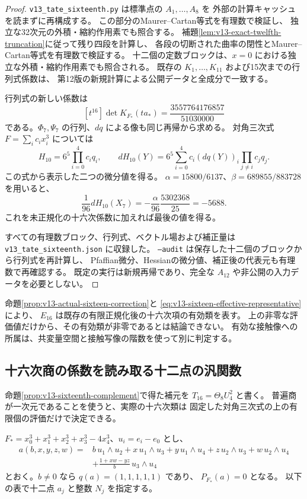 \begin{proof}
\texttt{v13\_tate\_sixteenth.py} は標準点の $A_1,\ldots,A_8$ を
外部の計算キャッシュを読まずに再構成する。
この部分のMaurer--Cartan等式を有理数で検証し、
独立な32次元の外積・縮約作用素でも照合する。
補題\ref{lem:v13-exact-twelfth-truncation}に従って残り四段を計算し、
各段の切断された曲率の閉性とMaurer--Cartan等式を有理数で検証する。
十二個の定数ブロックは、$x=0$ における独立な外積・縮約作用素でも照合される。
既存の $K_1,\ldots,K_{11}$ および15次までの行列式係数は、
第12版の新規計算による公開データと全成分で一致する。

行列式の新しい係数は
\[
 [t^{16}]\det K_{F_*}(ta_*)=\frac{3557764176857}{51030000}
\]
である。$\Phi_7,\Psi_7$ の行列、$dq$ による像も同じ再帰から求める。
対角三次式 $F=\sum_i c_ix_i^3$ については
\[
 H_{10}=6^5\prod_{i=0}^4c_iq_i,\qquad
 dH_{10}(Y)
 =6^5\sum_{i=0}^4 c_i(dq(Y))_i
                      \prod_{j\ne i}c_jq_j.
\]
この式から表示した二つの微分値を得る。
$\alpha=15800/6137$、$\beta=689855/883728$ を用いると、
\[
 \frac1{96}dH_{10}(X_7)
 =-\frac{\alpha}{96}\frac{5302368}{25}
 =-5688.
\]
これを未正規化の十六次係数に加えれば最後の値を得る。

すべての有理数ブロック、行列式、ベクトル場および補正量は
\texttt{v13\_tate\_sixteenth.json} に収録した。
\texttt{--audit} は保存した十二個のブロックから行列式を再計算し、
Pfaffian微分、Hessianの微分値、補正後の代表元も有理数で再確認する。
既定の実行は新規再帰であり、完全な $A_{12}$ や非公開の入力データを必要としない。
\end{proof}

命題\ref{prop:v13-actual-sixteen-correction}と
\eqref{eq:v13-sixteen-effective-representative}により、
$E_{16}$ は既存の有限正規化後の十六次項の有効類を表す。
上の非零な評価値だけから、その有効類が非零であるとは結論できない。
有効な接触像への所属は、共変量空間と接触写像の階数を使って別に判定する。

\subsection{十六次商の係数を読み取る十二点の汎関数}
\label{subsec:v13-sixteenth-rho}

命題\ref{prop:v13-sixteenth-complement}で得た補元を
$T_{16}=\Theta_8U_4^2$ と書く。
普遍商が一次元であることを使うと、実際の十六次類は
固定した対角三次式の上の有限個の評価だけで決定できる。

$F_*=x_0^3+x_1^3+x_2^3+x_3^3-4x_4^3$、$u_i=e_i-e_0$ とし、
\begin{align*}
 a(b,x,y,z,w)={}&b\,u_1\wedge u_2+x\,u_1\wedge u_3
       +y\,u_1\wedge u_4+z\,u_2\wedge u_3+w\,u_2\wedge u_4\\
 &+\frac{1+xw-yz}{b}\,u_3\wedge u_4
\end{align*}
とおく。$b\ne0$ なら $q(a)=(1,1,1,1,1)$ であり、
$P_{F_*}(a)=0$ となる。
以下の表で十二点 $a_j$ と整数 $N_j$ を指定する。

